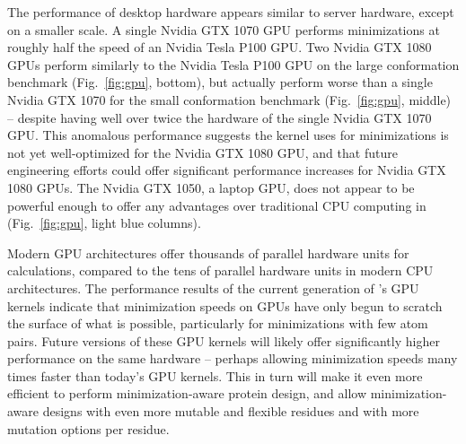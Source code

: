 The performance of desktop hardware appears similar to server hardware, except on a smaller scale. A single Nvidia GTX 1070 GPU performs minimizations at roughly half the speed of an Nvidia Tesla P100 GPU. Two Nvidia GTX 1080 GPUs perform similarly to the Nvidia Tesla P100 GPU on the large conformation benchmark (Fig.~\ref{fig:gpu}, bottom), but actually perform worse than a single Nvidia GTX 1070 for the small conformation benchmark (Fig.~\ref{fig:gpu}, middle) -- despite having well over twice the hardware of the single Nvidia GTX 1070 GPU. This anomalous performance suggests the kernel  uses for minimizations is not yet well-optimized for the Nvidia GTX 1080 GPU, and that future engineering efforts could offer significant performance increases for Nvidia GTX 1080 GPUs. The Nvidia GTX 1050, a laptop GPU, does not appear to be powerful enough to offer any advantages over traditional CPU computing in  (Fig.~\ref{fig:gpu}, light blue columns).

Modern GPU architectures offer thousands of parallel hardware units for calculations, compared to the tens of parallel hardware units in modern CPU architectures. The performance results of the current generation of \osprey's GPU kernels indicate that minimization speeds on GPUs have only begun to scratch the surface of what is possible, particularly for minimizations with few atom pairs. Future versions of these GPU kernels will likely offer significantly higher performance on the same hardware -- perhaps allowing minimization speeds many times faster than today's GPU kernels.  This in turn will make it even more efficient to perform minimization-aware protein design, and allow minimization-aware designs with even more mutable and flexible residues and with more mutation options per residue.  

